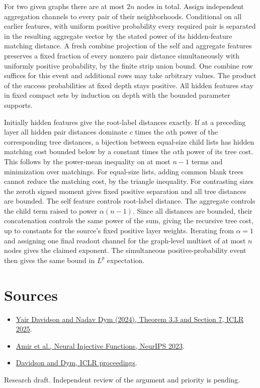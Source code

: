 \documentclass[10pt]{article}
\begin{document}
For two given graphs there are at most $2n$ nodes in total. Assign independent aggregation channels to every pair of their neighborhoods. Conditional on all earlier features, with uniform positive probability every required pair is separated in the resulting aggregate vector by the stated power of its hidden-feature matching distance. A fresh combine projection of the self and aggregate features preserves a fixed fraction of every nonzero pair distance simultaneously with uniformly positive probability, by the finite strip union bound. One combine row suffices for this event and additional rows may take arbitrary values. The product of the success probabilities at fixed depth stays positive. All hidden features stay in fixed compact sets by induction on depth with the bounded parameter supports.

Initially hidden features give the root-label distances exactly. If at a preceding layer all hidden pair distances dominate $c$ times the $\alpha$th power of the corresponding tree distances, a bijection between equal-size child lists has hidden matching cost bounded below by a constant times the $\alpha$th power of its tree cost. This follows by the power-mean inequality on at most $n-1$ terms and minimization over matchings. For equal-size lists, adding common blank trees cannot reduce the matching cost, by the triangle inequality. For contrasting sizes the zeroth signed moment gives fixed positive separation and all tree distances are bounded. The self feature controls root-label distance. The aggregate controls the child term raised to power $\alpha(n-1)$. Since all distances are bounded, their concatenation controls the same power of the sum, giving the recursive tree cost, up to constants for the source's fixed positive layer weights. Iterating from $\alpha=1$ and assigning one final readout channel for the graph-level multiset of at most $n$ nodes gives the claimed exponent. The simultaneous positive-probability event then gives the same bound in $L^p$ expectation.

\section*{Sources}
\begin{itemize}
\item \href{https://arxiv.org/abs/2406.06984}{Yair Davidson and Nadav Dym (2024), Theorem 3.3 and Section 7, ICLR 2025}.
\item \href{https://arxiv.org/abs/2306.06529}{Amir et al., Neural Injective Functions, NeurIPS 2023}.
\item \href{https://proceedings.iclr.cc/paper_files/paper/2025/hash/89d0d5c2f720921df93bbb8fef514571-Abstract-Conference.html}{Davidson and Dym, ICLR proceedings}.
\end{itemize}
{\small Research draft. Independent review of the argument and priority is pending.}
\end{document}
